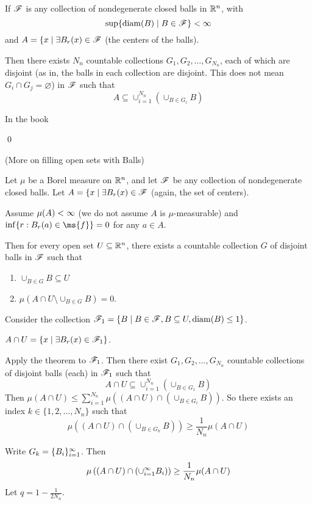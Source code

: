 \documentclass[x11names,reqno,14pt]{extarticle}
\newcommand{\seq}[2][\oo]{_{#2 = 1}^#1}
\newcommand{\cupi}[1][\oo]{\cup\seq[#1]{i}}
\DeclareMathOperator{\diam}{diam}
\begin{document}
If $\mathscr{F}$ is any collection of nondegenerate closed balls in $\mathbb{R}^n$, with 
\[
\sup\{\diam(B)\mid B \in \ms{F}\}<\oo
\]
and $A = \{x \mid \exists B_r(x) \in \mathscr{F}$ (the centers of the balls). 

Then there exists $N_n$ countable collections $G_1, G_2, \dots, G_{N_n}$, each of which are disjoint (as in, the balls in each collection are disjoint. This does not mean $G_i \cap G_j = \varnothing$) in $\mathscr{F}$ such that
\[
A \subseteq \cup_{i=1}^{N_n}(\cup_{B\in G_i}B)
\]

\proof

In the book

\qed 

\thm (More on filling open sets with Balls)

Let $\mu$ be a Borel measure on $\mathbb{R}^n$, and let $\mathscr{F}$ be any collection of nondegenerate closed balls. Let $A = \{x\mid \exists B_r(x) \in \mathscr{F}$ (again, the set of centers). 

Assume $\mu(A)<\infty$ (we do not assume $A$ is $\mu$-measurable) and $\inf\{r:B_r(a) \in \ms{f}\} = 0$ for any $a \in A$. 

Then for every open set $U \subseteq \mathbb{R}^n$, there exists a countable collection $G$ of disjoint balls in $\mathscr{F}$ such that
\begin{enumerate}

\item $\cup_{B\in G}B\subseteq U$ 

\item $\mu(A \cap U \setminus \cup_{B\in G}B) = 0$. 

\end{enumerate}

\proof

Consider the collection $\ms{F}_1 = \{B \mid B \in \ms{F}, B \subseteq U, \diam(B)\leq 1\}$. 

$A \cap U = \{x \mid \exists B_r(x) \in \mathscr{F}_1\}$. 

Apply the theorem to $\mathscr{F}_1$. Then there exist $G_1, G_2, \dots, G_{N_n}$ countable collections of disjoint balls (each) in $\mathscr{F}_1$ such that
\[
A \cap U \subseteq \cup_{i=1}^{N_n}(\cup_{B\in G_1}B)
\]
Then $\mu(A \cap U) \leq \sum_{i=1}^{N_n}\mu\left((A \cap U) \cap (\cup_{B\in G_i}B)\right)$. So there exists an index $k\in\{1, 2, \dots, N_n\}$ such that
\[
\mu\left((A \cap U) \cap (\cup_{B\in G_k}B)\right) \geq \frac{1}{N_n}\mu(A \cap U)
\]

Write $G_k = \{B_i\}\seq{i}$. Then
\[
\mu\left((A \cap U) \cap (\cupi B_i)\right) \geq \frac{1}{N_n}\mu(A \cap U)
\]
Let $q = 1 - \frac{1}{2N_n}$. 
\end{document}
